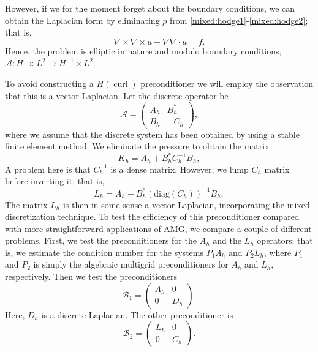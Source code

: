 However, if we for the moment forget about the boundary conditions,
we can obtain the Laplacian form  by eliminating $p$
from \eqref{mixed:hodge1}-\eqref{mixed:hodge2}; that is,
\[
\nabla \times \nabla \times u - \nabla \nabla \cdot u = f .
\]
Hence, the problem is elliptic
in nature and modulo boundary conditions,  $\mathcal{A}: H^1 \times L^2 \rightarrow  H^{-1} \times L^2$.

To avoid constructing a $H(\operatorname{curl})$ preconditioner we will employ
the observation that this is a vector Laplacian.
Let the discrete operator be
\[
\mathcal{A}  =
\begin{pmatrix} A_h & B_h^* \\ B_h & -C_h \end{pmatrix},
\]
where we assume that the discrete system has been obtained by using a stable finite
element method. We eliminate the pressure to obtain the matrix
\[
K_h  = A_h +  B_h^* C^{-1}_h B_h,
\]
A problem here is that $C^{-1}_h$ is a dense matrix. However, we lump $C_h$ matrix before inverting it; that is,
\[
L_h  = A_h +  B_h^* (\mathrm{diag}(C_h))^{-1} B_h,
\]
The matrix $L_h$ is then in some sense a vector Laplacian,
incorporating the mixed discretization technique.  To test the
efficiency of this preconditioner compared with more straightforward
applications of AMG, we compare a couple of different problems.
First, we test the preconditioners for the $A_h$ and the $L_h$
operators; that is, we estimate the condition number for the systems
$P_1 A_h$ and $P_2 L_h$, where $P_1$ and $P_2$ is simply the algebraic
multigrid preconditioners for $A_h$ and $L_h$, respectively.  Then we
test the preconditioners
\[
\mathcal{B}_1  =
\begin{pmatrix} A_h & 0  \\ 0  & D_h \end{pmatrix}.
\]
Here, $D_h$ is a discrete Laplacian. The other preconditioner is
\[
\mathcal{B}_2  =
\begin{pmatrix} L_h & 0  \\ 0  & C_h \end{pmatrix}.
\]


